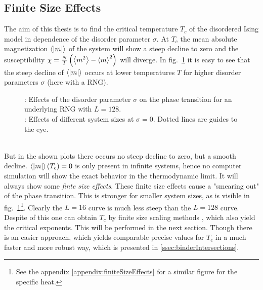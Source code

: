 \subsection{Finite Size Effects}
\label{ssec:finitesize}
    The aim of this thesis is to find the critical temperature \(T_c\)
    of the disordered Ising model in dependence of the disorder parameter
    \(\sigma\). At \(T_c\) the mean absolute magnetization \(\left< |m| \right>\) of
    the system will show a steep decline to zero and the susceptibility
    \(\chi = \frac{N}{T}\left(\left< m^2 \right>-\left< m \right>^2\right)\)
    will diverge. In fig.\ \ref{fig:smeared_out}
    it is easy to see that the steep decline of \(\left< |m| \right>\)
    occurs at lower temperatures \(T\) for higher
    disorder parameters \(\sigma\) (here with a RNG).
    \begin{figure}[htbp]
        \centering
        \caption[Phase Transition and Finite Size Effects]
        {
            : Effects of the disorder
            parameter $\sigma$ on the phase transition
            for an underlying RNG with $L=128$.\\
            : Effects of different system
            sizes at \(\sigma = 0\). Dotted lines are guides to the eye.
        }
        \label{fig:smeared_out}
    \end{figure}\\
    But in the shown plots there occurs no steep decline to zero, but a
    smooth decline. \(\left< \left\vert m\right\vert \right>(T_c) = 0\) is only present in infinite
    systems, hence no computer simulation will show the exact behavior in the
    thermodynamic limit. It will always show some \emph{finte size effects}.
    These finite size effects cause a "smearing out" of the phase
    transition. This is stronger for smaller system sizes, as is visible
    in fig.\ \ref{fig:smeared_out}\footnote{See the appendix \ref{appendix:finiteSizeEffects} for a similar figure for the specific heat.}.
    Clearly the \(L=16\) curve is much less steep than the \(L=128\) curve.\\
    Despite of this one can obtain \(T_c\) by finite size scaling
    methods \cite[p. 232ff]{NewmanBarkema1999}, which also yield the critical
    exponents. This will be performed in the next section.
    Though there is an easier approach, which yields comparable precise
    values for \(T_{c}\) in a much faster and more robust way, which is
    presented in \ref{ssec:binderIntersections}.

